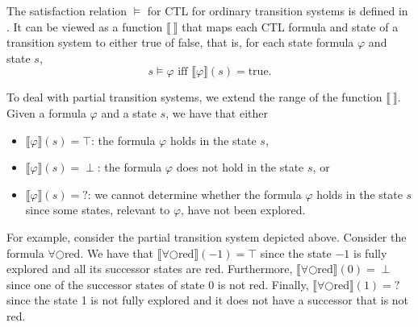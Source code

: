\documentclass[12pt]{article}
\newcommand{\nxt}{\bigcirc}
\theoremstyle{definition}
\newcommand{\satisfaction}[1]{\llbracket #1 \rrbracket}
\begin{document}
The satisfaction relation $\models$ for CTL for ordinary transition systems is defined in \cite[Definition~6.4]{BK08}.  It can be viewed as a function $\satisfaction{\ }$ that maps each CTL formula and state of a transition system to either true of false, that is, for each state formula $\varphi$ and state $s$,
\[
s \models \varphi \mbox{ iff } \satisfaction{\varphi}(s) = \mbox{true}.
\]

To deal with partial transition systems, we extend the range of the function $\satisfaction{\ }$.  Given a formula $\varphi$ and a state $s$, we have that either
\begin{itemize}
\item 
$\satisfaction{\varphi}(s) = \top$: the formula $\varphi$ holds in the state $s$,
\item
$\satisfaction{\varphi}(s) = \perp$: the formula $\varphi$ does not hold in the state $s$, or
\item
$\satisfaction{\varphi}(s) = \mathord{?}$: we cannot determine whether the formula $\varphi$ holds in the state $s$ since some states, relevant to $\varphi$,  have not been explored.
\end{itemize}

For example, consider the partial transition system depicted above.  Consider the formula $\forall \nxt \mbox{red}$.  We have that $\satisfaction{\forall \nxt \mbox{red}}(-1) = \top$ since the state $-1$ is fully explored and all its successor states are red.  Furthermore, $\satisfaction{\forall \nxt \mbox{red}}(0) = \perp$ since one of the  successor states of state 0 is not red.  Finally, $\satisfaction{\forall \nxt \mbox{red}}(1) = \mathord{?}$ since the state 1 is not fully explored and it does not have a successor that is not red.
\end{document}
